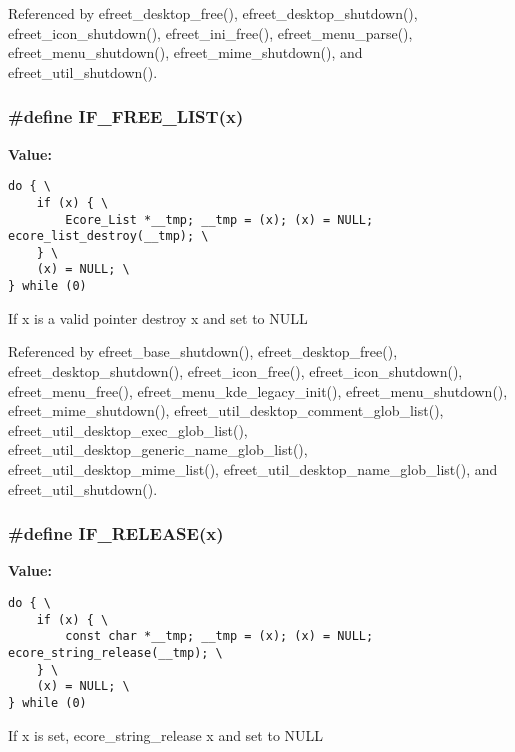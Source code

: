 Referenced by efreet\_\-desktop\_\-free(), efreet\_\-desktop\_\-shutdown(), efreet\_\-icon\_\-shutdown(), efreet\_\-ini\_\-free(), efreet\_\-menu\_\-parse(), efreet\_\-menu\_\-shutdown(), efreet\_\-mime\_\-shutdown(), and efreet\_\-util\_\-shutdown().
\subsubsection{\setlength{\rightskip}{0pt plus 5cm}\#define IF\_\-FREE\_\-LIST(x)}\label{group__Efreet__Private_gde363b5f0b3fa4175bac51488b44c672}


\textbf{Value:}

\begin{Code}\begin{verbatim}do { \
    if (x) { \
        Ecore_List *__tmp; __tmp = (x); (x) = NULL; ecore_list_destroy(__tmp); \
    } \
    (x) = NULL; \
} while (0)
\end{verbatim}
\end{Code}
If x is a valid pointer destroy x and set to NULL 

Referenced by efreet\_\-base\_\-shutdown(), efreet\_\-desktop\_\-free(), efreet\_\-desktop\_\-shutdown(), efreet\_\-icon\_\-free(), efreet\_\-icon\_\-shutdown(), efreet\_\-menu\_\-free(), efreet\_\-menu\_\-kde\_\-legacy\_\-init(), efreet\_\-menu\_\-shutdown(), efreet\_\-mime\_\-shutdown(), efreet\_\-util\_\-desktop\_\-comment\_\-glob\_\-list(), efreet\_\-util\_\-desktop\_\-exec\_\-glob\_\-list(), efreet\_\-util\_\-desktop\_\-generic\_\-name\_\-glob\_\-list(), efreet\_\-util\_\-desktop\_\-mime\_\-list(), efreet\_\-util\_\-desktop\_\-name\_\-glob\_\-list(), and efreet\_\-util\_\-shutdown().
\subsubsection{\setlength{\rightskip}{0pt plus 5cm}\#define IF\_\-RELEASE(x)}\label{group__Efreet__Private_g12d3ef74a56458d7f0ae27e00447fe16}


\textbf{Value:}

\begin{Code}\begin{verbatim}do { \
    if (x) { \
        const char *__tmp; __tmp = (x); (x) = NULL; ecore_string_release(__tmp); \
    } \
    (x) = NULL; \
} while (0)
\end{verbatim}
\end{Code}
If x is set, ecore\_\-string\_\-release x and set to NULL 

